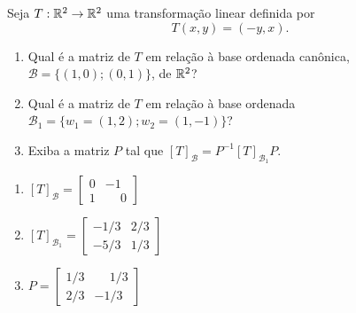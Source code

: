 \documentclass[12pt]{exam}
\begin{document}
\begin{exercicio}
    Seja $T : \mathbb{R}^2 \to \mathbb{R}^2$ uma transformação linear definida por
    \[
    T(x,y) = (-y,x).
    \]
    \begin{enumerate}[label={\alph*})]
        \item Qual é a matriz de $T$ em relação à base ordenada canônica, $\mathcal{B} = \{(1,0); (0,1)\}$, de $\mathbb{R}^2$?

        \item Qual é a matriz de $T$ em relação à base ordenada $\mathcal{B}_1 = \{w_1 = (1,2); w_2 = (1,-1)\}$?

        \item Exiba a matriz $P$ tal que $[T]_{\mathcal{B}} = P^{-1}[T]_{\mathcal{B}_1}P$.
    \end{enumerate}
    \begin{solucao}
        \begin{enumerate}[label={\alph*})]
            \item $[T]_\mathcal{B} = \begin{bmatrix}
                0 & -1\\
                1 & \phantom{-}0
            \end{bmatrix}$

            \item $[T]_{\mathcal{B}_1} = \begin{bmatrix}
                -1/3 & 2/3\\
                -5/3 & 1/3
            \end{bmatrix}$

            \item $P = \begin{bmatrix}
                1/3 & \phantom{-}1/3\\
                2/3 & -1/3
            \end{bmatrix}$
        \end{enumerate}
    \end{solucao}
\end{exercicio}
\end{document}
